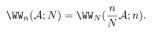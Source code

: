 \begin{equation}
\label{scalingancora}
\WW_n({\cal A};N)=\WW_N(\frac{n}{N}{\cal A};n).
\end{equation}

